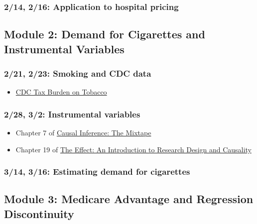 \documentclass[11pt,]{article}
\providecommand{\tightlist}{%
  \setlength{\itemsep}{0pt}\setlength{\parskip}{0pt}}
\begin{document}
\hypertarget{application-to-hospital-pricing}{%
\subsubsection{2/14, 2/16: Application to hospital
pricing}\label{application-to-hospital-pricing}}

\hypertarget{module-2-demand-for-cigarettes-and-instrumental-variables}{%
\subsection{Module 2: Demand for Cigarettes and Instrumental
Variables}\label{module-2-demand-for-cigarettes-and-instrumental-variables}}

\hypertarget{smoking-and-cdc-data}{%
\subsubsection{2/21, 2/23: Smoking and CDC
data}\label{smoking-and-cdc-data}}

\begin{itemize}
\tightlist
\item
  \href{https://github.com/imccart/CDC-Tobacco}{CDC Tax Burden on
  Tobacco}
\end{itemize}

\hypertarget{instrumental-variables}{%
\subsubsection{2/28, 3/2: Instrumental
variables}\label{instrumental-variables}}

\begin{itemize}
\tightlist
\item
  Chapter 7 of \href{https://mixtape.scunning.com/}{Causal Inference:
  The Mixtape}
\item
  Chapter 19 of \href{https://theeffectbook.net/}{The Effect: An
  Introduction to Research Design and Causality}
\end{itemize}

\hypertarget{estimating-demand-for-cigarettes}{%
\subsubsection{3/14, 3/16: Estimating demand for
cigarettes}\label{estimating-demand-for-cigarettes}}

\hypertarget{module-3-medicare-advantage-and-regression-discontinuity}{%
\subsection{Module 3: Medicare Advantage and Regression
Discontinuity}\label{module-3-medicare-advantage-and-regression-discontinuity}}
\end{document}

